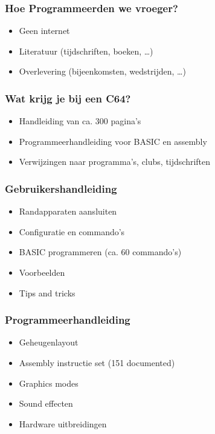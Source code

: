 \documentclass[aspectratio=43]{uva-inf-presentation}
\begin{document}

\begin{frame}
\frametitle{Hoe Programmeerden we vroeger?}

\begin{itemize}
\item Geen internet
\item Literatuur (tijdschriften, boeken, \dots)
\item Overlevering (bijeenkomsten, wedstrijden, \dots)
\end{itemize}

\end{frame}


\begin{frame}
\frametitle{Wat krijg je bij een C64?}

\begin{itemize}
\item Handleiding van ca. 300 pagina's
\item Programmeerhandleiding voor BASIC en assembly
\item Verwijzingen naar programma's, clubs, tijdschriften
\end{itemize}

\end{frame}


\begin{frame}
\frametitle{Gebruikershandleiding}

\begin{itemize}
\item Randapparaten aansluiten
\item Configuratie en commando's
\item BASIC programmeren (ca. 60 commando's)
\item Voorbeelden
\item Tips and tricks
\end{itemize}

\end{frame}


\begin{frame}
\frametitle{Programmeerhandleiding}

\begin{itemize}
\item Geheugenlayout
\item Assembly instructie set (151 documented)
\item Graphics modes
\item Sound effecten
\item Hardware uitbreidingen
\end{itemize}

\end{frame}
\end{document}
